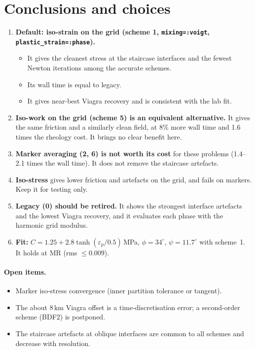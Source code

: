 \documentclass[11pt,a4paper]{article}
\newcommand{\eps}{\varepsilon}
\begin{document}
\section{Conclusions and choices}

\begin{enumerate}
\item \textbf{Default: iso-strain on the grid (scheme 1, \texttt{mixing=:voigt}, \texttt{plastic\_strain=:phase}).}
  \begin{itemize}
  \item It gives the cleanest stress at the staircase interfaces and the fewest Newton iterations among the accurate schemes.
  \item Its wall time is equal to legacy.
  \item It gives near-best Viagra recovery and is consistent with the lab fit.
  \end{itemize}
\item \textbf{Iso-work on the grid (scheme 5) is an equivalent alternative.} It gives the same friction and a similarly clean field, at 8\% more wall time and 1.6 times the rheology cost. It brings no clear benefit here.
\item \textbf{Marker averaging (2, 6) is not worth its cost} for these problems (1.4--2.1 times the wall time). It does not remove the staircase artefacts.
\item \textbf{Iso-stress} gives lower friction and artefacts on the grid, and fails on markers. Keep it for testing only.
\item \textbf{Legacy (0) should be retired.} It shows the strongest interface artefacts and the lowest Viagra recovery, and it evaluates each phase with the harmonic grid modulus.
\item \textbf{Fit:} $C=1.25+2.8\tanh(\eps_p/0.5)$\,MPa, $\phi=34^\circ$, $\psi=11.7^\circ$ with scheme~1. It holds at MR (rms $\le0.009$).
\end{enumerate}

\paragraph{Open items.}
\begin{itemize}
\item Marker iso-stress convergence (inner partition tolerance or tangent).
\item The about 8\,km Viagra offset is a time-discretisation error; a second-order scheme (BDF2) is postponed.
\item The staircase artefacts at oblique interfaces are common to all schemes and decrease with resolution.
\end{itemize}
\end{document}
